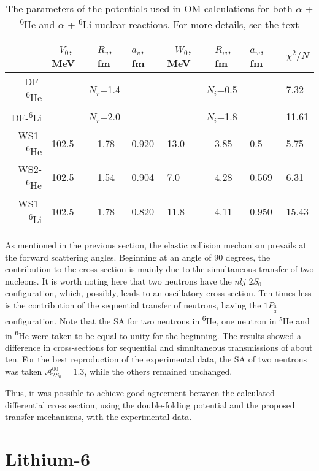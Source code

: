 \documentclass[
12pt, %
oneside, %
english, %
onehalfspacing, %
onehalfspacing, %
headsepline, %
]{MastersDoctoralThesis} %
\newcommand{\he}{\textsuperscript{6}He\xspace}
\newcommand{\li}{\textsuperscript{6}Li\xspace}
\begin{document}
\begin{table}[bp]
\footnotesize
\caption{The parameters of the potentials used in OM calculations for both $\alpha$ + \he and $\alpha$ + \li nuclear reactions. For more details, see the text}
\label{tab:he_elastic}
\begin{tabular*}{\textwidth}{@{\extracolsep{\fill}}rlllllll}
\hline
    & $-V_0$, MeV & $R_v$, fm & $a_v$, fm & $-W_0$, MeV & $R_w$, fm & $a_w$, fm & $\chi^2/N$ \\ \hline
DF-\he  & \multicolumn{3}{c}{$N_r$=1.4}        & \multicolumn{3}{c}{$N_i$=0.5}        & 7.32      \\
DF-\li  & \multicolumn{3}{c}{$N_r$=2.0}        & \multicolumn{3}{c}{$N_i$=1.8}        & 11.61      \\
WS1-\he & 102.5       & 1.78      & 0.920     & 13.0        & 3.85      & 0.5       & 5.75      \\
WS2-\he & 102.5       & 1.54      & 0.904     & 7.0         & 4.28      & 0.569     & 6.31      \\ 
WS1-\li & 102.5       & 1.78      & 0.820     & 11.8         & 4.11      & 0.950     & 15.43      \\
\hline
\end{tabular*}
\end{table}

As mentioned in the previous section, the elastic collision mechanism prevails at the forward scattering angles. Beginning at an angle of 90 degrees, the contribution to the cross section is mainly due to the simultaneous transfer of two nucleons. It is worth noting here that two neutrons have the $nlj$ $2S_0$ configuration, which, possibly, leads to an oscillatory cross section. Ten times less is the contribution of the sequential transfer of neutrons, having the $1P_{\frac{3}{2}}$ configuration. Note that the SA for two neutrons in \he, one neutron in $^5$He and in \he were taken to be equal to unity for the beginning. The results showed a difference in cross-sections for sequential and simultaneous transmissions of about ten. For the best reproduction of the experimental data, the SA of two neutrons was taken  $\mathcal{A}^{00}_{2S_0}=1.3$, while the others remained unchanged.

Thus, it was possible to achieve good agreement between the calculated differential cross section, using the double-folding potential and the proposed transfer mechanisms, with the experimental data.


\chapter{Lithium-6}
\end{document}
